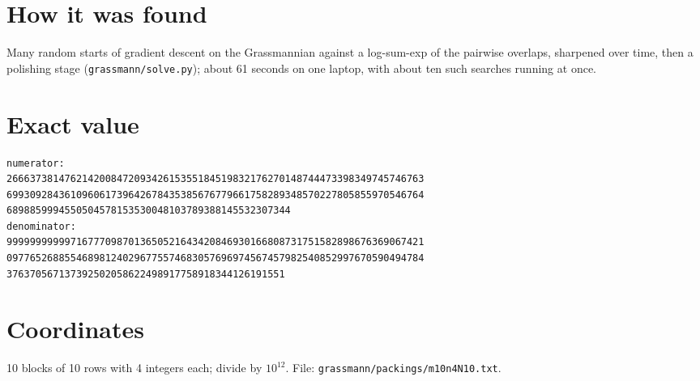 \documentclass[11pt,a4paper]{article}
\begin{document}
\section{How it was found}
Many random starts of gradient descent on the Grassmannian against a log-sum-exp of the pairwise overlaps, sharpened over time, then a polishing stage (\texttt{grassmann/solve.py}); about 61 seconds on one laptop, with about ten such searches running at once.


\appendix
\section{Exact value}
{\small
\begin{verbatim}
numerator:
266637381476214200847209342615355184519832176270148744473398349745746763
699309284361096061739642678435385676779661758289348570227805855970546764
6898859994550504578153530048103789388145532307344
denominator:
999999999997167770987013650521643420846930166808731751582898676369067421
097765268855468981240296775574683057696974567457982540852997670590494784
376370567137392502058622498917758918344126191551
\end{verbatim}}

\section{Coordinates}
10 blocks of 10 rows with 4 integers each; divide by $10^{12}$. File: \texttt{grassmann/packings/m10n4N10.txt}.
{\tiny
\begin{multicols}{3}
\end{multicols}}
\end{document}

